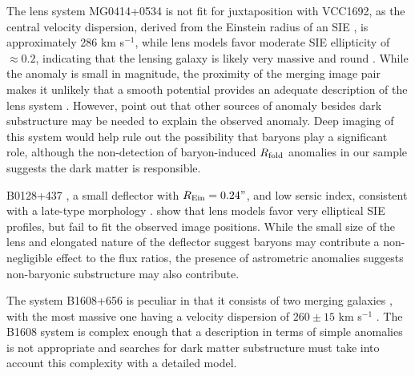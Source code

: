 \begin{itemize}
	\vspace{1cm} The lens system MG0414+0534 is not fit for juxtaposition with VCC1692, as the central velocity dispersion, derived from the Einstein radius of an SIE \cite{Xu++15}, is approximately 286 km s$^{-1}$, while lens models favor moderate SIE ellipticity of $\approx 0.2$, indicating that the lensing galaxy is likely very massive and round \cite{Hewitt++92}. While the anomaly is small in magnitude, the proximity of the merging image pair makes it unlikely that a smooth potential provides an adequate description of the lens system \cite{Minezaki++09,Keeton05,Xu++15}. However, \cite{Xu++15} point out that other sources of anomaly besides dark substructure may be needed to explain the observed anomaly. Deep imaging of this system would help rule out the possibility that baryons play a significant role, although the non-detection of baryon-induced $R_{\rm{fold}}$ anomalies in our sample suggests the dark matter is responsible. 
	
	\vspace{1cm} B0128+437 \cite{Phillips++00}, a small deflector with $R_{\rm{Ein}}=0.24"$, and low sersic index, consistent with a late-type morphology \cite{Lagattuta++10}. \cite{Biggs++04} show that lens models favor very elliptical SIE profiles, but fail to fit the observed image positions. While the small size of the lens and elongated nature of the deflector suggest baryons may contribute a non-negligible effect to the flux ratios, the presence of astrometric anomalies suggests non-baryonic substructure may also contribute.
	
	The system B1608+656 \cite{Fassnacht++96} is peculiar in that it consists of two merging galaxies \cite{Fassnacht++02}, with the most massive one having a velocity dispersion of $260\pm15$ km s$^{-1}$ \cite{Suyu++10}. The B1608 system is complex enough that a  description in terms of simple anomalies is not appropriate and searches for dark matter substructure must take into account this complexity with a detailed model.
	

\end{itemize}
